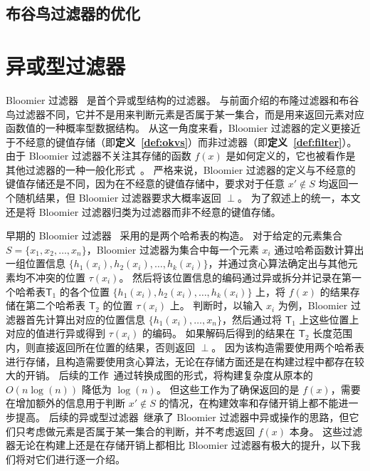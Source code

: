 
\subsection{布谷鸟过滤器的优化}


\section{异或型过滤器}\label{sec:xor-based-filters}

Bloomier 过滤器~\cite{chazelle2004bloomier,charles2008bloomier} 是首个异或型结构的过滤器。
与前面介绍的布隆过滤器和布谷鸟过滤器不同，它并不是用来判断元素是否属于某一集合，而是用来返回元素对应函数值的一种概率型数据结构。
从这一角度来看，Bloomier 过滤器的定义更接近于不经意的键值存储（即\textbf{定义~\ref{def:okvs}}）而非过滤器（即\textbf{定义~\ref{def:filter}}）。
由于 Bloomier 过滤器不关注其存储的函数 $f(x)$ 是如何定义的，它也被看作是其他过滤器的一种一般化形式~\cite{graf2020xor,li2023chainedfilter}。
严格来说，Bloomier 过滤器的定义与不经意的键值存储还是不同，因为在不经意的键值存储中，要求对于任意 $x'\notin S$ 均返回一个随机结果，但 Bloomier 过滤器要求大概率返回 $\perp$。
为了叙述上的统一，本文还是将 Bloomier 过滤器归类为过滤器而非不经意的键值存储。

早期的 Bloomier 过滤器~\cite{chazelle2004bloomier} 采用的是两个哈希表的构造。
对于给定的元素集合 $S= \{x_1, x_2, \dots, x_n\}$，Bloomier 过滤器为集合中每一个元素 $x_i$ 通过哈希函数计算出一组位置信息 $\{h_1(x_i), h_2(x_i), \dots, h_k(x_i)\}$，并通过贪心算法确定出与其他元素均不冲突的位置 $\tau(x_i)$。
然后将该位置信息的编码通过异或拆分并记录在第一个哈希表$\mathsf{T}_1$ 的各个位置 $\{h_1(x_i), h_2(x_i), \dots, h_k(x_i)\}$ 上，将 $f(x)$ 的结果存储在第二个哈希表 $\mathsf{T}_2$ 的位置 $\tau(x_i)$ 上。
判断时，以输入 $x_i$ 为例，Bloomier 过滤器首先计算出对应的位置信息 $\{h_1(x_i), \dots, x_n\}$，然后通过将 $\mathsf{T}_1$ 上这些位置上对应的值进行异或得到 $\tau(x_i)$ 的编码。
如果解码后得到的结果在 $\mathsf{T}_2$ 长度范围内，则直接返回所在位置的结果，否则返回 $\perp$。
因为该构造需要使用两个哈希表进行存储，且构造需要使用贪心算法，无论在存储方面还是在构建过程中都存在较大的开销。
后续的工作~\cite{charles2008bloomier}通过转换成图的形式，将构建复杂度从原本的 $O(n\log(n))$ 降低为 $\log(n)$。
但这些工作为了确保返回的是 $f(x)$，需要在增加额外的信息用于判断 $x'\notin S$ 的情况，在构建效率和存储开销上都不能进一步提高。
后续的异或型过滤器~\cite{graf2020xor,dillinger2021ribbon,graf2022binary}继承了 Bloomier 过滤器中异或操作的思路，但它们只考虑做元素是否属于某一集合的判断，并不考虑返回 $f(x)$ 本身。
这些过滤器无论在构建上还是在存储开销上都相比 Bloomier 过滤器有极大的提升，以下我们将对它们进行逐一介绍。

